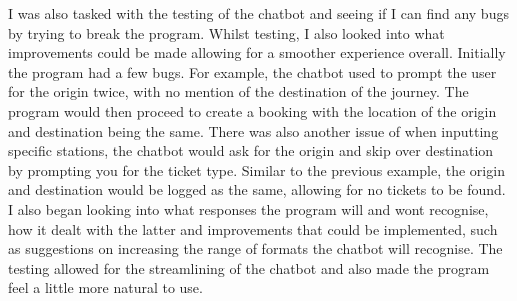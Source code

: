 \documentclass{article}
\begin{document}
I was also tasked with the testing of the chatbot and seeing if I can find any bugs by trying to break the program. Whilst testing, I also looked into what improvements could be made allowing for a smoother experience overall. Initially the program had a few bugs. For example, the chatbot used to prompt the user for the origin twice, with no mention of the destination of the journey. The program would then proceed to create a booking with the location of the origin and destination being the same. There was also another issue of when inputting specific stations, the chatbot would ask for the origin and skip over destination by prompting you for the ticket type. Similar to the previous example, the origin and destination would be logged as the same, allowing for no tickets to be found. I also began looking into what responses the program will and wont recognise, how it dealt with the latter and improvements that could be implemented, such as suggestions on increasing the range of formats the chatbot will recognise. The testing allowed for the streamlining of the chatbot and also made the program feel a little more natural to use. 
\end{document}
